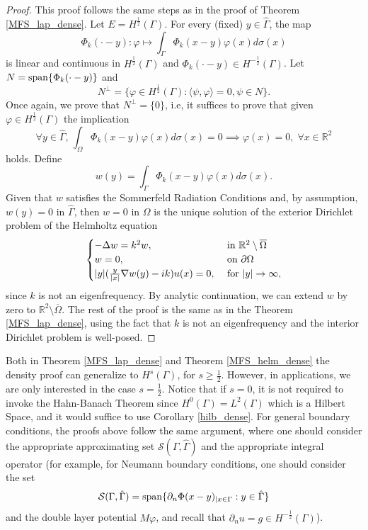 \begin{proof}
    This proof follows the same steps as in the proof of Theorem \ref{MFS_lap_dense}. Let \(E = H^\frac{1}{2}(\Gamma)\). For every (fixed) \(y \in \hat{\Gamma}\), the map
    \[
        \Phi_k(\cdot-y): \varphi \mapsto \int_\Gamma \Phi_k(x-y)\varphi(x)d\sigma(x)
    \]
    is linear and continuous in \(H^\frac{1}{2}(\Gamma)\) and \(\Phi_k(\cdot-y) \in H^{-\frac{1}{2}}(\Gamma)\). Let \(N = \operatorname{span}\{\Phi_k(\cdot-y)\}\) and
    \[
        N^\perp = \{\varphi \in H^\frac{1}{2}(\Gamma): \langle \psi, \varphi \rangle = 0, \psi \in N\}.
    \]
    Once again, we prove that \(N^\perp = \{0\}\), i.e, it suffices to prove that given \(\varphi \in H^\frac{1}{2}(\Gamma)\) the implication
    \[
        \forall y \in \hat{\Gamma}, \, \int_\Omega \Phi_k(x-y)\varphi(x)d\sigma(x) = 0 \implies \varphi(x) = 0, \; \forall x \in \mathbb{R}^2
    \]
    holds. Define
    \[
        w(y) = \int_\Gamma \Phi_k(x-y)\varphi(x)d\sigma(x).
    \]
    Given that \(w\) satisfies the Sommerfeld Radiation Conditions and, by assumption, \(w(y) = 0\) in \(\hat{\Gamma}\), then \(w = 0\) in \(\Omega\) is the unique solution of the exterior Dirichlet problem of the Helmholtz equation
    \[
        \begin{cases}
            -\Delta w = k^2 w, & \text{ in } \mathbb{R}^2\setminus \overline{\Omega}\\
            w = 0, & \text{ on } \partial \Omega\\
            \abs{y} (\frac{y}{\abs{x}}\nabla w(y) - i k)u(x) = 0, & \text{ for } \abs{y} \rightarrow \infty,
        \end{cases}
    \]
    since \(k\) is not an eigenfrequency. By analytic continuation, we can extend \(w\) by zero to \(\mathbb{R}^2\setminus \overline{\Omega}\). The rest of the proof is the same as in the Theorem \ref{MFS_lap_dense}, using the fact that \(k\) is not an eigenfrequency and the interior Dirichlet problem is well-posed.
\end{proof}
\begin{remark}\label{density_remark_general_bc_and_hilbert}
    Both in Theorem \ref{MFS_lap_dense} and Theorem \ref{MFS_helm_dense} the density proof can generalize to \(H^s(\Gamma)\), for \(s \geq \frac{1}{2}\). However, in applications, we are only interested in the case \(s=\frac{1}{2}\). Notice that if \(s=0\), it is not required to invoke the Hahn-Banach Theorem since \(H^0(\Gamma)=L^2(\Gamma)\) which is a Hilbert Space, and it would suffice to use Corollary \eqref{hilb_dense}. For general boundary conditions, the proofs above follow the same argument, where one should consider the appropriate approximating set \(\mathcal{S}(\Gamma, \hat{\Gamma})\) and the appropriate integral operator (for example, for Neumann boundary conditions, one should consider the set
    \[
        \mathcal{S}(\Gamma, \hat{\Gamma}) = \operatorname{span}\{\partial_n \Phi(x-y)_{|x \in \Gamma} : y \in \hat{\Gamma}\}
    \]
    and the double layer potential \(M\varphi\), and recall that \(\partial_n u = g \in H^{-\frac{1}{2}}(\Gamma)\)).
\end{remark}
